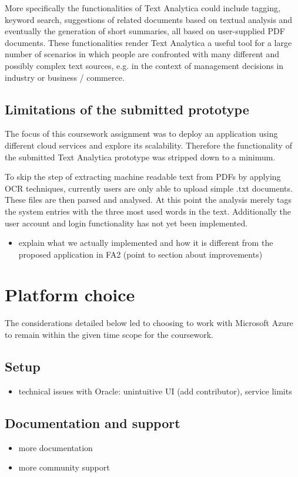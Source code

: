 \documentclass[conference]{IEEEtran}
\begin{document}
More specifically the functionalities of Text Analytica could include tagging, keyword search, suggestions of related documents based on textual analysis and eventually the generation of short summaries, all based on user-supplied PDF documents. These functionalities render Text Analytica a useful tool for a large number of scenarios in which people are confronted with many different and possibly complex text sources, e.g. in the context of management decisions in industry or business / commerce.

\subsection{Limitations of the submitted prototype}
The focus of this coursework assignment was to deploy an application using different cloud services and explore its scalability. Therefore the functionality of the submitted Text Analytica prototype was stripped down to a minimum.

To skip the step of extracting machine readable text from PDFs by applying OCR techniques, currently users are only able to upload simple .txt documents. These files are then parsed and analysed. At this point the analysis merely tags the system entries with the three most used words in the text.
Additionally the user account and login functionality has not yet been implemented.

\begin{itemize}
	\item explain what we actually implemented and how it is different from the proposed application in FA2 (point to section about improvements)
\end{itemize}

\section{Platform choice}
The considerations detailed below led to choosing to work with Microsoft Azure to remain within the given time scope for the coursework.
\subsection{Setup}
\begin{itemize}
	\item technical issues with Oracle: unintuitive UI (add contributor), service limits
\end{itemize}

\subsection{Documentation and support}
\begin{itemize}
	\item more documentation
	\item more community support
\end{itemize}
\end{document}

